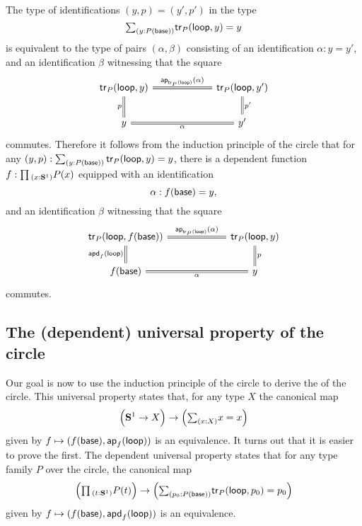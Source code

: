 \begin{rmk}\label{rmk:circle-induction}
  The type of identifications $(y,p)=(y',p')$ in the type
  \begin{equation*}
    \sm{y:P(\base)}\tr_P(\lloop,y)=y
  \end{equation*}
  is equivalent to the type of pairs $(\alpha,\beta)$ consisting of an identification $\alpha:y=y'$, and an identification $\beta$ witnessing that the square
  \begin{equation*}
    \begin{tikzcd}[column sep=6em]
      \tr_P(\lloop,y) \arrow[d,equals,swap,"p"] \arrow[r,equals,"\ap{\tr_P(\lloop)}{\alpha}"] & \tr_P(\lloop,y') \arrow[d,equals,"{p'}"] \\
      y \arrow[r,equals,swap,"\alpha"] & y'
    \end{tikzcd}
  \end{equation*}
  commutes. Therefore it follows from the induction principle of the circle that for any $(y,p):\sm{y:P(\base)}\tr_P(\lloop,y)=y$, there is a dependent function $f:\prd{x:\sphere{1}}P(x)$ equipped with an identification
  \begin{equation*}
    \alpha : f(\mathsf{base})=y,
  \end{equation*}
  and an identification $\beta$ witnessing that the square
  \begin{equation*}
    \begin{tikzcd}[column sep=6em]
      \tr_P(\lloop,f(\base)) \arrow[d,equals,swap,"{\apd{f}{\lloop}}"] \arrow[r,equals,"\ap{\tr_P(\lloop)}{\alpha}"] & \tr_P(\lloop,y) \arrow[d,equals,"{p}"] \\
      f(\base) \arrow[r,equals,swap,"\alpha"] & y
    \end{tikzcd}
  \end{equation*}
  commutes.  
\end{rmk}

\subsection{The (dependent) universal property of the circle}

Our goal is now to use the induction principle of the circle to derive the  of the circle. This universal property states that, for any type $X$ the canonical map
\begin{equation*}
  \Big(\sphere{1}\to X\Big)\to\Big(\sm{x:X}x=x\Big)
\end{equation*}
given by $f\mapsto(f(\mathsf{base}),\mathsf{ap}_{f}({\mathsf{loop}}))$ is an equivalence. It turns out that it is easier to prove the  first. The dependent universal property states that for any type family $P$ over the circle, the canonical map
\begin{equation*}
  \Big(\prd{t:\sphere{1}}P(t)\Big)\to\Big(\sm{p_0:P(\base)}\tr_P(\lloop,p_0)=p_0\Big)
\end{equation*}
given by $f\mapsto(f(\mathsf{base}),\mathsf{apd}_{f}\mathopen{}\left(\mathsf{loop}\right)\mathclose{})$ is an equivalence.

